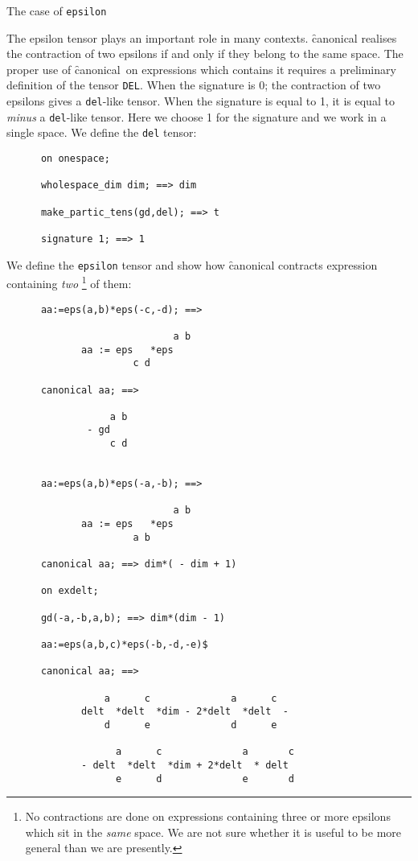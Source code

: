 \begin{center}
The case of \texttt{epsilon}
\end{center}
The epsilon tensor plays an important role in many contexts.
\f{canonical} realises the contraction of two epsilons if and only if
they belong to the same space. The proper use of \f{canonical}\ on expressions
which contains it requires a preliminary definition of the tensor \texttt{DEL}.
When the signature is 0; the contraction of
two epsilons gives a \texttt{del}-like tensor. When the
signature is equal to 1, it is equal to \emph{minus} a \texttt{del}-like tensor.
Here we choose 1 for the signature%
 and we work in a
single space.
We define the \texttt{del} tensor:
\begin{verbatim}
      on onespace;

      wholespace_dim dim; ==> dim

      make_partic_tens(gd,del); ==> t

      signature 1; ==> 1
\end{verbatim}
We define the \texttt{epsilon} tensor and show how \f{canonical} contracts
expression containing \emph{two}%
\footnote{No contractions are done on expressions containing
three or more epsilons which sit in the \emph{same} space.
 We are not sure whether it is useful
to be more general than we are presently.}
 of them:
\begin{verbatim}
      aa:=eps(a,b)*eps(-c,-d); ==>

                             a b
             aa := eps   *eps
                      c d

      canonical aa; ==>

                  a b
              - gd
                  c d


      aa:=eps(a,b)*eps(-a,-b); ==>

                             a b
             aa := eps   *eps
                      a b

      canonical aa; ==> dim*( - dim + 1)

      on exdelt;

      gd(-a,-b,a,b); ==> dim*(dim - 1)

      aa:=eps(a,b,c)*eps(-b,-d,-e)$

      canonical aa; ==>

                 a      c              a      c
             delt  *delt  *dim - 2*delt  *delt  -
                 d      e              d      e

                   a      c              a       c
             - delt  *delt  *dim + 2*delt  * delt
                   e      d              e       d
\end{verbatim}
